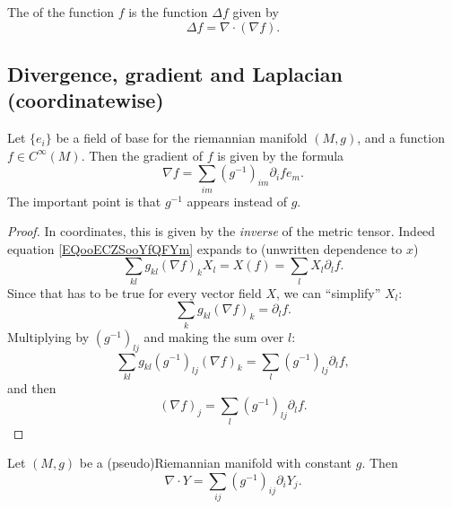The  of the function $f$ is the function $\Delta f$ given by
\begin{equation}
	\Delta f=\nabla\cdot(\nabla f).
\end{equation}

\subsection{Divergence, gradient and Laplacian (coordinatewise)}

\begin{proposition}
	Let \( \{ e_i \}\) be a field of base for the riemannian manifold \( (M,g)\), and a function \( f\in C^{\infty}(M)\). Then the gradient of \( f\) is given by the formula
	\begin{equation}
		\nabla f=\sum_{im}(g^{-1})_{im}\partial_ife_m.
	\end{equation}
	The important point is that \( g^{-1}\) appears instead of \( g\).
\end{proposition}

\begin{proof}
	In coordinates, this is given by the \emph{inverse} of the metric tensor. Indeed equation \eqref{EQooECZSooYfQFYm} expands to (unwritten dependence to \( x\))
	\begin{equation}
		\sum_{kl}g_{kl}(\nabla f)_kX_l=X(f)=\sum_lX_l\partial_lf.
	\end{equation}
	Since that has to be true for every vector field \( X\), we can ``simplify'' \( X_l\):
	\begin{equation}
		\sum_kg_{kl}(\nabla f)_k=\partial_lf.
	\end{equation}
	Multiplying by \( (g^{-1})_{lj}\) and making the sum over \( l\):
	\begin{equation}
		\sum_{kl}g_{kl}(g^{-1})_{lj}(\nabla f)_k=\sum_l(g^{-1})_{lj}\partial_lf,
	\end{equation}
	and then
	\begin{equation}
		(\nabla f)_j=\sum_l(g^{-1})_{lj}\partial_lf.
	\end{equation}
\end{proof}

\begin{proposition} \label{PROPooLIJTooKFTwPY}
	Let \( (M,g)\) be a (pseudo)Riemannian manifold with constant \( g\). Then
	\begin{equation}
		\nabla\cdot Y=\sum_{ij}(g^{-1})_{ij}\partial_iY_j.
	\end{equation}
\end{proposition}

